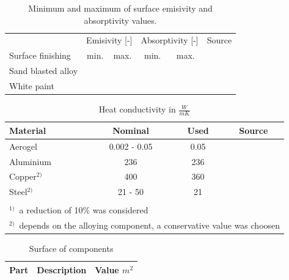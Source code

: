 \begin{table}[htb]
	\centering
	\begin{tabular}{lccccc}
		\hline
		& \multicolumn{2}{l}{Emisivity [-]} & \multicolumn{2}{l}{Absorptivity [-]}& Source  \\ 
		Surface finishing	&	min. & max. 	&	min. & max.  & \\\hline
		Sand blasted alloy & & & & & \\
		White paint & & & & & \\
	\end{tabular}
	\caption{Minimum and maximum of surface emisivity and absorptivity values.}
	\label{tab:tcs_surface}
\end{table}

\begin{table}[htb]
	\centering
	\begin{tabular}{lccc}
		\hline
		Material & Nominal & Used & Source \\ \hline
		Aerogel & 0.002 - 0.05 & 0.05 & \\
		Aluminium & 236 & 236 & \\
		Copper$^{2)}$ &  400 & 360 & \\
		Steel$^{2)}$ & 21 - 50 & 21 & \\ \hline
		& & & \\
		\multicolumn{4}{l}{\small{$^{1)}$\ a reduction of 10\% was considered}}\\
		\multicolumn{4}{l}{\small{$^{2)}$\ depends on the alloying component, a conservative value was choosen }}\\
	\end{tabular}
	\caption{Heat conductivity in $\frac{W}{mK}$}
	\label{tab:tcs_conduct2}
\end{table}

\begin{table}[htb]
	\centering
	\begin{tabular}{lcc}
		\hline
		Part & Description & Value $m^2$  \\ \hline
		
	\end{tabular}
	\caption{Surface of components}
	\label{tab:tcs_surf}
\end{table}


